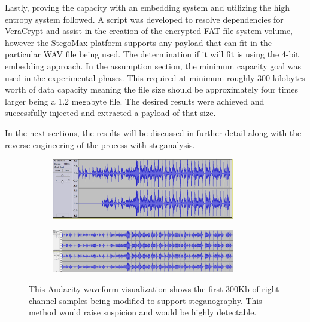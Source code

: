 \documentclass[letterpaper]{article}
\begin{document}
Lastly, proving the capacity with an embedding system and utilizing the high entropy system followed. A script was developed to resolve dependencies for VeraCrypt and assist in the creation of the encrypted FAT file system volume, however the StegoMax platform supports any payload that can fit in the particular WAV file being used. The determination if it will fit is using the 4-bit embedding approach. In the assumption section, the minimum capacity goal was used in the experimental phases. This required at minimum roughly 300 kilobytes worth of data capacity meaning the file size should be approximately four times larger being a 1.2 megabyte file. The desired results were achieved and successfully injected and extracted a payload of that size.

In the next sections, the results will be discussed in further detail along with the reverse engineering of the process with steganalysis.

\begin{figure}[tbh]
    \begin{subfigure}[t]{0.3\textwidth}
      \includegraphics[width=8cm]{images/1channel.png}
      \caption{}
   \end{subfigure}
   \begin{subfigure}[t]{0.3\textwidth}
     \includegraphics[width=8cm]{images/beforeafter.png}
     \caption{}
   \end{subfigure}
         \caption{This Audacity waveform visualization shows the first 300Kb of right channel samples being modified to support steganography. This method would raise suspicion and would be highly detectable. 
   }
    \label{fig:1channel}
\end{figure}
\end{document}

